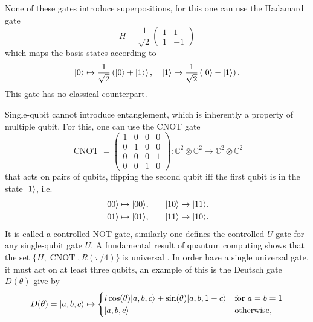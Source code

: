 \documentclass[a4paper,10pt,oneside]{book}
\theoremstyle{plain}
\theoremstyle{definition}
\theoremstyle{remark}
\DeclarePairedDelimiter\ket{\lvert}{\rangle}
\begin{document}
None of these gates introduce superpositions, for this one can use the Hadamard gate
\begin{equation}\label{eq:hadamard}
  H = \frac{1}{\sqrt{2}} \begin{pmatrix} 1 & 1 \\ 1 & -1 \end{pmatrix}
\end{equation}
which maps the basis states according to
\begin{equation}
  \ket{0} \mapsto \frac{1}{\sqrt{2}} \left( \ket{0} + \ket{1} \right), \quad
  \ket{1} \mapsto \frac{1}{\sqrt{2}} \left( \ket{0} - \ket{1} \right).
\end{equation}
This gate has no classical counterpart.

Single-qubit cannot introduce entanglement, which is inherently a property of multiple qubit. For this, one can use the CNOT gate
\begin{equation}
  \operatorname{CNOT} =
  \begin{pmatrix}
    1 & 0 & 0 & 0 \\
    0 & 1 & 0 & 0 \\
    0 & 0 & 0 & 1 \\
    0 & 0 & 1 & 0
  \end{pmatrix} : \mathbb{C}^2 ⊗ \mathbb{C}^2 \to \mathbb{C}^2 ⊗ \mathbb{C}^2
\end{equation}
that acts on pairs of qubits, flipping the second qubit iff the first qubit is in the state $\ket{1}$, i.e.
\begin{equation}
  \begin{aligned}
    \ket{00} \mapsto \ket{00},\quad &\quad \ket{10} \mapsto \ket{11}. \\
    \ket{01} \mapsto \ket{01},\quad &\quad \ket{11} \mapsto \ket{10}.
  \end{aligned}
\end{equation}
It is called a controlled-NOT gate, similarly one defines the controlled-$U$ gate for any single-qubit gate $U$. A fundamental result of quantum computing shows that the set $\{H, \operatorname{CNOT}, R(\pi/4)\}$ is universal \cite{nielsen chuang}. In order have a single universal gate, it must act on at least three qubits, an example of this is the Deutsch gate $D(\theta)$ give by
\begin{equation}
  D(\theta) = \ket{a,b,c} \mapsto
  \begin{cases}
    i \cos(\theta) \ket{a,b,c} + \sin(\theta) \ket{a,b,1-c} & \mbox{for }a=b=1 \\
    \ket{a,b,c} & \mbox{otherwise,}
  \end{cases}
\end{equation}
\end{document}
